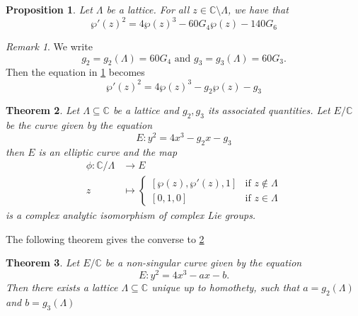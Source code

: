 \documentclass{article}
\newtheorem{theorem}{Theorem}[section]
\newtheorem{proposition}[theorem]{Proposition}
\theoremstyle{definition}
\theoremstyle{remark}
\newtheorem*{remark}{Remark}
\newcommand{\C}{\mathbb{C}}
\begin{document}
\begin{proposition}
	\label{prop:diffeq}
	Let $\Lambda$ be a lattice.
	For all $z \in \C \setminus \Lambda$, we have that
	\begin{equation*}
		\wp'(z)^2 = 4\wp(z)^3 - 60G_4\wp(z) - 140G_6
	\end{equation*}
\end{proposition}

\begin{remark}
	We write
	\begin{equation*}
		g_2 = g_2(\Lambda) = 60G_4
		\textrm{ and }
		g_3 = g_3(\Lambda) = 60G_3.
	\end{equation*}
	Then the equation in \ref{prop:diffeq} becomes
	\begin{equation*}
		\wp'(z)^2 = 4\wp(z)^3 - g_2\wp(z) - g_3
	\end{equation*}
\end{remark}

\begin{theorem}
	\label{thm:lattice-curve}
	Let $\Lambda \subseteq \C$ be a lattice
	and $g_2, g_3$ its associated quantities.
	Let $E/\C$ be the curve given by the equation
	\begin{equation*}
		E: y^2 = 4x^3 - g_2 x - g_3
	\end{equation*}
	then $E$ is an elliptic curve and the map
	\begin{align*}
		\phi: \C/\Lambda &\to E\\
		z &\mapsto 
		\begin{cases}
			[\wp(z), \wp'(z), 1] &\textrm{if } z \not\in \Lambda\\
			[0, 1, 0] &\textrm{if } z \in \Lambda
		\end{cases}
	\end{align*}
	is a complex analytic isomorphism of complex Lie groups.
\end{theorem}

The following theorem gives the converse to \ref{thm:lattice-curve}

\begin{theorem}
	\label{thm:curve-lattice}
	Let $E/\C$ be a non-singular curve given by the equation
	\begin{equation*}
		E: y^2 = 4x^3 - ax - b.
	\end{equation*} 
	Then there exists a lattice
	$\Lambda \subseteq \C$ unique up to homothety, such that
	$a = g_2(\Lambda)$ and $b = g_3(\Lambda)$
\end{theorem}
\end{document}
